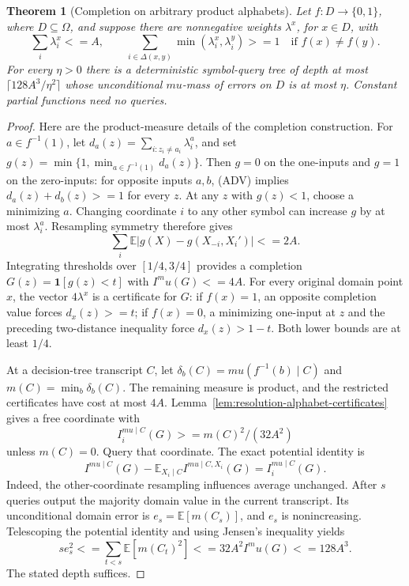 \documentclass[11pt]{article}
\newtheorem{theorem}{Theorem}[section]
\theoremstyle{definition}
\theoremstyle{remark}
\def\mu{mu}\def\rho{rho}\def\le{<=}\def\ge{>=}%
\begin{document}
\begin{theorem}[Completion on arbitrary product alphabets]
\label{thm:resolution-alphabet-completion}
Let \(f:D\to\{0,1\}\), where \(D\subseteq\Omega\), and suppose
there are nonnegative weights \(\lambda^x\), for \(x\in D\), with
\[
 \sum_i\lambda_i^x\le A,
 \qquad
 \sum_{i\in\Delta(x,y)}\min(\lambda_i^x,\lambda_i^y)\ge1
 \quad\text{if }f(x)\ne f(y).
 \tag{ADV}
\]
For every \(\eta>0\) there is a deterministic symbol-query tree of
depth at most \(\lceil128A^3/\eta^2\rceil\) whose unconditional
\(\mu\)-mass of errors on \(D\) is at most \(\eta\).
Constant partial functions need no queries.
\end{theorem}

\begin{proof}
Here are the product-measure details of the completion construction.
For \(a\in f^{-1}(1)\), let
\(d_a(z)=\sum_{i:z_i\ne a_i}\lambda_i^a\), and set
\(g(z)=\min\{1,\min_{a\in f^{-1}(1)}d_a(z)\}\).
Then \(g=0\) on the one-inputs and \(g=1\) on the zero-inputs:
for opposite inputs \(a,b\), (ADV) implies
\(d_a(z)+d_b(z)\ge1\) for every \(z\).
At any \(z\) with \(g(z)<1\), choose a minimizing \(a\).
Changing coordinate \(i\) to any other symbol can increase \(g\)
by at most \(\lambda_i^a\). Resampling symmetry therefore gives
\[
 \sum_i\mathbb E|g(X)-g(X_{-i},X_i')|\le2A.
\]
Integrating thresholds over \([1/4,3/4]\) provides a completion
\(G(z)=\mathbf1[g(z)<t]\) with \(I^\mu(G)\le4A\).
For every original domain point \(x\), the vector \(4\lambda^x\)
is a certificate for \(G\): if \(f(x)=1\), an opposite completion
value forces \(d_x(z)\ge t\); if \(f(x)=0\), a minimizing
one-input at \(z\) and the preceding two-distance inequality force
\(d_x(z)>1-t\). Both lower bounds are at least \(1/4\).

At a decision-tree transcript \(C\), let
\(\delta_b(C)=\mu(f^{-1}(b)\mid C)\) and
\(m(C)=\min_b\delta_b(C)\). The remaining measure is product,
and the restricted certificates have cost at most \(4A\).
Lemma~\ref{lem:resolution-alphabet-certificates} gives a free
coordinate with
\[
 I_i^{\mu\mid C}(G)\ge m(C)^2/(32A^2)
\]
unless \(m(C)=0\). Query that coordinate. The exact potential
identity is
\[
 I^{\mu\mid C}(G)
 -\mathbb E_{X_i\mid C} I^{\mu\mid C,X_i}(G)
 = I_i^{\mu\mid C}(G).
\]
Indeed, the other-coordinate resampling influences average unchanged.
After \(s\) queries output the majority domain value in the current
transcript. Its unconditional domain error is
\(e_s=\mathbb E[m(C_s)]\), and \(e_s\) is nonincreasing.
Telescoping the potential identity and using Jensen's inequality yields
\[
 s e_s^2\le\sum_{t<s}\mathbb E[m(C_t)^2]
 \le32A^2 I^\mu(G)\le128A^3.
\]
The stated depth suffices.
\end{proof}
\end{document}
